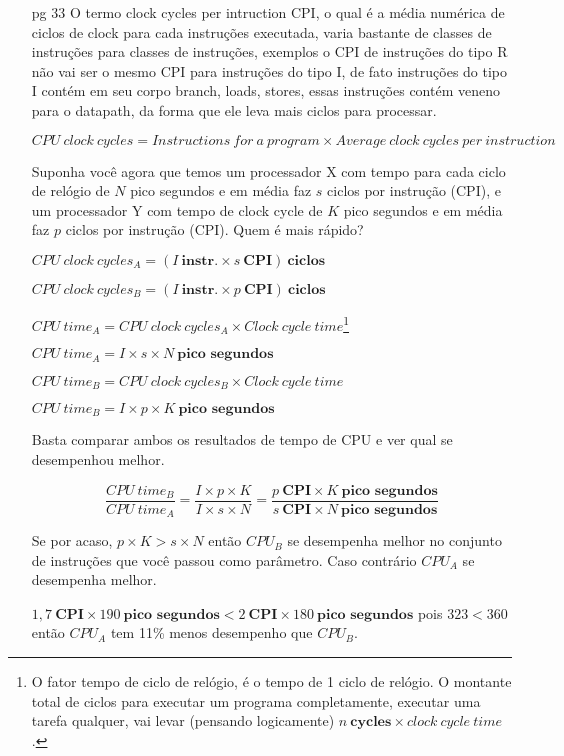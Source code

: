 \documentclass{article}
\begin{document}
\begin{enumerate}
\item[pg 33] O termo clock cycles per intruction CPI, o qual é a média numérica 
de ciclos de clock para cada instruções executada, varia bastante de classes de 
instruções para classes de instruções, exemplos o CPI de instruções do tipo R 
não vai ser o mesmo CPI para instruções do tipo I, de fato instruções do tipo I 
contém em seu corpo branch, loads, stores, essas instruções contém veneno para 
o datapath, da forma que ele leva mais ciclos para processar.

$$CPU\ clock\ cycles = Instructions\ for\ a\ program \times Average\ clock\ 
cycles\ per\ instruction$$

Suponha você agora que temos um processador X com tempo para cada ciclo de 
relógio de $N$ pico segundos e em média faz $s$ ciclos por instrução (CPI), e 
um processador Y com tempo de clock cycle de $K$ pico segundos e em média faz 
$p$ ciclos por instrução (CPI). Quem é mais rápido?

$CPU\ clock\ cycles_{A} = (I\ \textbf{instr.} \times s\ \textbf{CPI})\ 
\textbf{ciclos}$

$CPU\ clock\ cycles_{B} = (I\ \textbf{instr.} \times p\ \textbf{CPI})\ 
\textbf{ciclos}$

$CPU\ time_{A} = CPU\ clock\ cycles_{A} \times Clock\ cycle\ time$\footnote{O 
fator tempo de ciclo de relógio, é o tempo de 1 ciclo de relógio. O montante 
total de ciclos para executar um programa completamente, executar uma tarefa 
qualquer, vai levar (pensando logicamente) $n\ \textbf{cycles} \times clock\ 
cycle\ time$.}

$CPU\ time_{A} = I \times s \times N\ \textbf{pico segundos}$

$CPU\ time_{B} = CPU\ clock\ cycles_{B} \times Clock\ cycle\ time$

$CPU\ time_{B} = I \times p \times K\ \textbf{pico segundos}$

Basta comparar ambos os resultados de tempo de CPU e ver qual se desempenhou 
melhor.

$$\frac{CPU\ time_{B}}{CPU\ time_{A}} = \frac{I \times p \times K}{I \times s 
\times N} = \frac{p\ \textbf{CPI} \times K\ \textbf{pico segundos}}{s\ 
\textbf{CPI} \times N\ \textbf{pico segundos}}$$

Se por acaso, $p \times K > s \times N$ então $CPU_{B}$ se desempenha melhor no 
conjunto de instruções que você passou como parâmetro. Caso contrário $CPU_{A}$ 
se desempenha melhor.

$1,7\ \textbf{CPI} \times 190\ \textbf{pico segundos} < 2\ \textbf{CPI} \times 
180\ \textbf{pico segundos}$ pois $323 < 360$ então $CPU_{A}$ tem 11\% menos 
desempenho que $CPU_{B}$.


\end{enumerate}
\end{document}
